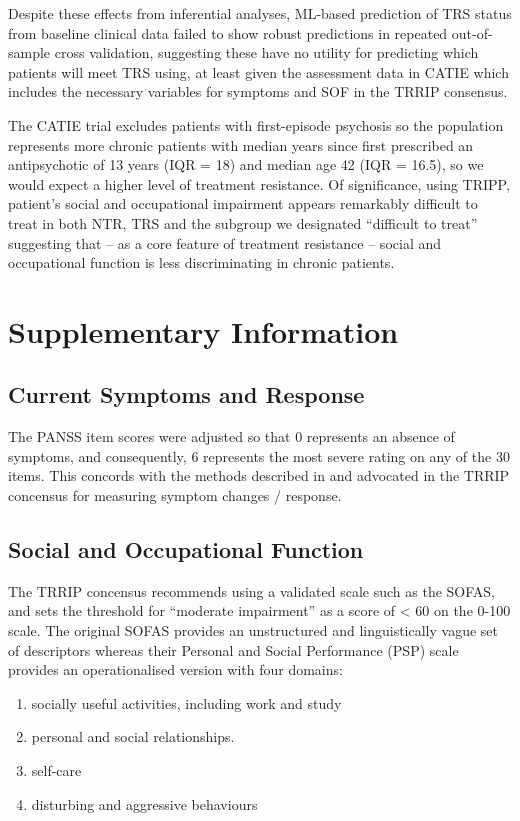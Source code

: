 \documentclass[a4paper,nobib]{article}
\begin{document}
Despite these effects from inferential analyses, ML-based prediction of TRS status from baseline clinical data failed to show robust predictions in repeated out-of-sample cross validation, suggesting these have no utility for predicting which patients will meet TRS using, at least given the assessment data in CATIE which includes the necessary variables for symptoms and SOF in the TRRIP consensus.  

The CATIE trial excludes patients with first-episode psychosis so the population represents more chronic patients with median years since first prescribed an antipsychotic of 13 years (IQR = 18) and median age 42 (IQR = 16.5), so we would expect a higher level of treatment resistance.  Of significance, using TRIPP, patient's social and occupational impairment appears remarkably difficult to treat in both NTR, TRS and the subgroup we designated ``difficult to treat'' suggesting that -- as a core feature of treatment resistance -- social and occupational function is less discriminating in chronic patients.


\newpage
\setcounter{section}{1}
\setcounter{table}{0}
\renewcommand{\thesection}{S\arabic{section}} 
\renewcommand{\thetable}{S\arabic{table}}
\section*{Supplementary Information}
\subsection{Current Symptoms and Response}

The PANSS item scores were adjusted so that 0 represents an absence of symptoms, and consequently, 6 represents the most severe rating on any of the 30 items.  This concords with the methods described in \citep{Leucht2009} and advocated in the TRRIP concensus for measuring symptom changes / response.

\subsection{Social and Occupational Function}\label{SI:SOF}
The TRRIP concensus recommends using a validated scale such as the SOFAS, and sets the threshold for ``moderate impairment'' as a score of < 60 on the 0-100 scale. The original SOFAS provides an unstructured and linguistically vague set of descriptors \cite{Morosini2000} whereas their Personal and Social Performance (PSP) scale provides an operationalised version with four domains: 
\begin{enumerate}[label=(\Alph*)]
	\item socially useful activities, including work and study
	\item personal and social relationships. 
	\item self-care
	\item disturbing and aggressive behaviours
\end{enumerate}
\end{document}
